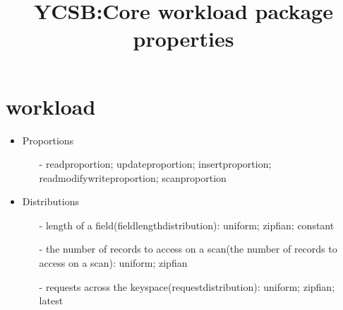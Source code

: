 \documentclass[UTF8,a4paper]{ctexart}
\begin{document}
	\title{YCSB:Core workload package properties}
	\date{}
	\maketitle
	
	\section{workload}
	\begin{itemize}
		\item Proportions 
		\begin{itemize}
			\small\item[-] readproportion; updateproportion; insertproportion; readmodifywriteproportion; scanproportion
		\end{itemize}
		
		\item Distributions
		\begin{itemize}
			\small\item[-] length of a field(fieldlengthdistribution): uniform; zipfian; constant
			\small\item[-] the number of records to access on a scan(the number of records to access on a scan): uniform; zipfian
			\small\item[-] requests across the keyspace(requestdistribution): uniform; zipfian; latest
		\end{itemize}
		
	
	\end{itemize}
	
\end{document}
